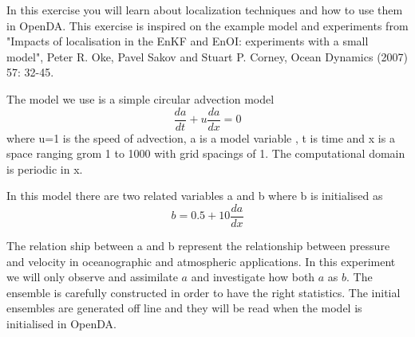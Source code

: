In this exercise you will learn about localization techniques and how to use them in OpenDA. This exercise is inspired on the example model and experiments from "Impacts of localisation in the EnKF and EnOI: experiments with a small model", Peter R. Oke, Pavel Sakov and Stuart P. Corney, Ocean Dynamics (2007) 57: 32-45.

The model we use is a simple circular advection model 
\begin{equation}
\frac{da}{dt}+u\frac{da}{dx}=0
\end{equation}
where u=1 is the speed of advection, a is a model variable , t is time and x is a space ranging grom 1 to 1000 with grid spacings of 1. The computational domain is periodic in x.

In this model there are two related variables a and b where b is initialised as
\begin{equation}\label{eg:b_relation}
b= 0.5 + 10 \frac{da}{dx}
\end{equation}

The relation ship between a and b represent the relationship between pressure and velocity in oceanographic and atmospheric applications. In this experiment we will only observe and assimilate $a$ and investigate how both $a$ as $b$. The ensemble is carefully constructed in order to have the right statistics. The initial ensembles are generated off line and they will be read when the model is initialised in OpenDA. 

